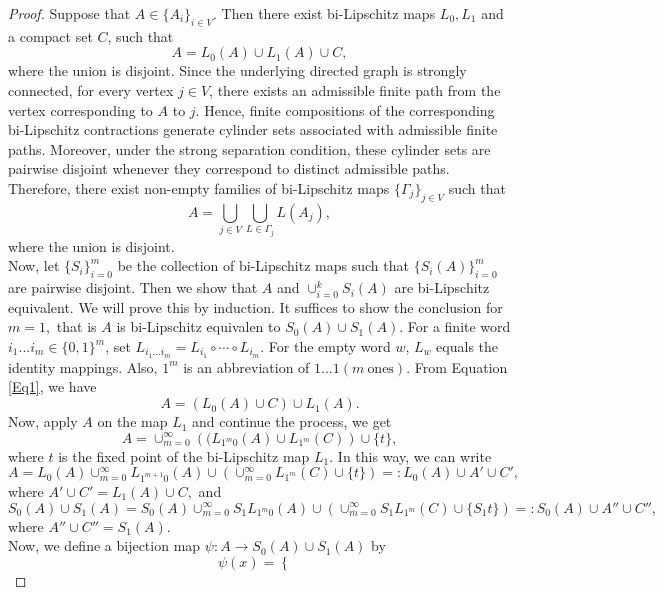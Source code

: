 \documentclass[a4paper,12pt,reqno]{amsart}
\numberwithin{equation}{section}
\theoremstyle{definition}
\theoremstyle{remark}
\numberwithin{equation}{section}
\begin{document}
\begin{proof}
Suppose that $ A \in \{A_i\}_{i \in V}$. Then there exist bi-Lipschitz maps $L_0, L_1$ and a compact set $C$, such that
\begin{equation} \label{Eq1}
    A=L_0(A) \cup L_1(A) \cup C,
\end{equation}
 where the union is disjoint. Since the underlying directed graph is strongly connected, for every vertex \(j\in V\), there exists an admissible finite path from the vertex corresponding to \(A\) to \(j\). Hence, finite compositions of the corresponding bi-Lipschitz contractions generate cylinder sets associated with admissible finite paths. Moreover, under the strong separation condition, these cylinder sets are pairwise disjoint whenever they correspond to distinct admissible paths. Therefore, there exist non-empty families of bi-Lipschitz maps \(\{\Gamma_j\}_{j\in V}\) such that
 \begin{equation}\label{Eq2}
     A=\bigcup_{j \in V} \bigcup_{L \in \Gamma_j } L (A_j),
 \end{equation}
where the union is disjoint.\\
Now, let  $\{S_i\}_{i=0}^m$ be the collection of bi-Lipschitz maps such that $\{S_i(A)\}_{i=0}^m$ are pairwise disjoint. Then we show that $A$ and $ \cup_{i=0}^k S_i(A)$ are bi-Lipschitz  equivalent.
We will prove this by induction. It suffices to show the conclusion for $m=1,$ that is $A$ is bi-Lipschitz equivalen to $S_0(A) \cup S_1(A).$ For a finite word $i_1...i_m \in \{0,1\}^m$, set $L_{i_1...i_m}=L_{i_1} \circ \cdots \circ L_{i_m}.$ For the empty word $w$, $L_w$ equals the identity mappings. Also, $1^m$ is an abbreviation of $1...1 (m~ \text{ones})$. From Equation \ref{Eq1}, we have $$A=(L_0(A) \cup C) \cup L_1(A).$$ Now, apply $A$ on the map $L_1$  and continue the process, we get
$$A=\cup_{m=0}^\infty \left((L_{1^m0}(A) \cup L_{1^m} (C) \right) \cup \{t\},$$ where $t$ is the fixed point of the bi-Lipschitz map $L_1.$ In this way, we can write
$$A=L_0(A) \cup_{m=0}^\infty L_{1^{m+1}0}(A) \cup \left( \cup_{m=0}^\infty L_{1^m}(C) \cup \{t\}\right)=:L_0 (A) \cup A' \cup C',$$ where $A' \cup C'=L_1 (A) \cup C,$ and
$$S_0(A)\cup S_1 (A)=S_0(A) \cup_{m=0}^\infty S_1L_{1^{m}0}(A) \cup \left( \cup_{m=0}^\infty S_1L_{1^m}(C) \cup \{S_1t\}\right)=:S_0 (A) \cup A''\cup C'',$$ where $A'' \cup C''=S_1(A).$\\
Now, we define a bijection map $\psi: A \to S_0(A) \cup S_1(A)$ by 
\begin{equation*}
\psi(x)=\begin{cases}

\end{cases}
\end{equation*}
\end{proof}
\end{document}

